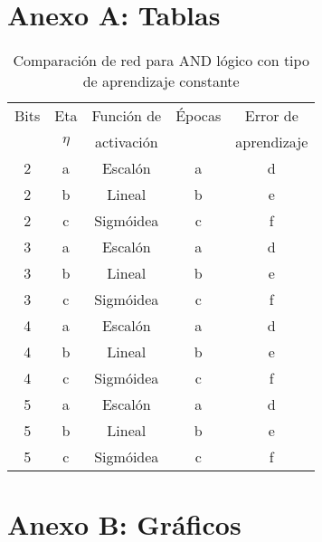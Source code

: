 \documentclass[%
    final,
    reprint,
    notitlepage,
    narroweqnarray,
    inline,
    twoside,
    invited
    ]{ieee}
\begin{document}







\clearpage
\onecolumn
\section*{Anexo A: Tablas}

\begin{table}[H]
\begin{center}
\begin{tabular}{|c|c|c|c|c|}
\hline
Bits &  Eta & Función de &  Épocas & Error de\\
 & $\eta$ & activación &  & aprendizaje\\

\hline
\hline

2 & a & Escalón & a & d\\
\hline
2 & b & Lineal & b & e\\
\hline
2 & c & Sigmóidea & c & f\\
\hline
\hline
3 & a & Escalón & a & d\\
\hline
3 & b & Lineal & b & e\\
\hline
3 & c & Sigmóidea & c & f\\
\hline
\hline
4 & a & Escalón & a & d\\
\hline
4 & b & Lineal & b & e\\
\hline
4 & c & Sigmóidea & c & f\\
\hline
\hline
5 & a & Escalón & a & d\\
\hline
5 & b & Lineal & b & e\\
\hline
5 & c & Sigmóidea & c & f\\
\hline

\end{tabular}
\end{center}
\caption{Comparación de red para AND lógico con tipo de aprendizaje constante}\label{tablaIDFS}
\end{table}


\section*{Anexo B: Gráficos}

\end{document}
